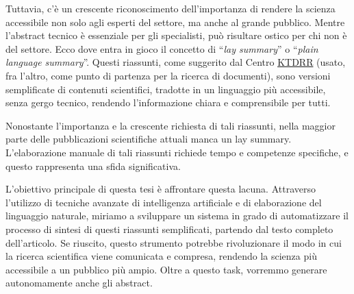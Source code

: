 \documentclass[12pt,a4paper,twoside,openright]{book}
\begin{document}
Tuttavia, c'è un crescente riconoscimento dell'importanza di rendere la scienza accessibile non solo agli esperti del settore, ma anche al grande pubblico. Mentre l'abstract tecnico è essenziale per gli specialisti, può risultare ostico per chi non è del settore. Ecco dove entra in gioco il concetto di ``\emph{lay summary}'' o ``\emph{plain language summary}''. Questi riassunti, come suggerito dal Centro \href{https://ktdrr.org/resources/plst/}{KTDRR} (usato, fra l'altro, come punto di partenza per la ricerca di documenti), sono versioni semplificate di contenuti scientifici, tradotte in un linguaggio più accessibile, senza gergo tecnico, rendendo l'informazione chiara e comprensibile per tutti.

Nonostante l'importanza e la crescente richiesta di tali riassunti, nella maggior parte delle pubblicazioni scientifiche attuali manca un lay summary. L'elaborazione manuale di tali riassunti richiede tempo e competenze specifiche, e questo rappresenta una sfida significativa.

L'obiettivo principale di questa tesi è affrontare questa lacuna. Attraverso l'utilizzo di tecniche avanzate di intelligenza artificiale e di elaborazione del linguaggio naturale, miriamo a sviluppare un sistema in grado di automatizzare il processo di sintesi di questi riassunti semplificati, partendo dal testo completo dell'articolo. Se riuscito, questo strumento potrebbe rivoluzionare il modo in cui la ricerca scientifica viene comunicata e compresa, rendendo la scienza più accessibile a un pubblico più ampio. Oltre a questo task, vorremmo generare autonomamente anche gli abstract.
\end{document}

